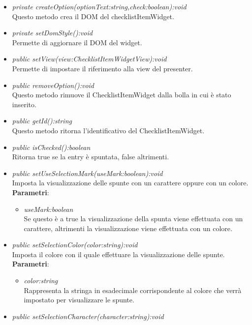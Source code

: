 \begin{itemize}
\begin{itemize}
\begin{itemize}
		\end{itemize}
	\item \textit{private createOption(optionText:string,check:boolean):void}\\
	Questo metodo crea il DOM del checklistItemWidget.
	\item \textit{private setDomStyle():void}\\
	Permette di aggiornare il DOM del widget.
	\item \textit{public setView(view:ChecklistItemWidgetView):void}\\
	Permette di impostare il riferimento alla view del presenter.
	\item \textit{public removeOption():void}\\
	Questo metodo rimuove il ChecklistItemWidget dalla bolla in cui è stato inserito.
	\item \textit{public getId():string}\\
	Questo metodo ritorna l'identificativo del ChecklistItemWidget.
	\item \textit{public isChecked():boolean}\\
	Ritorna true se la entry è spuntata, false altrimenti.
	\item \textit{public setUseSelectionMark(useMark:boolean):void}\\
	Imposta la visualizzazione delle spunte con un carattere oppure con un colore.
		\\ \textbf{Parametri}: \begin{itemize}
		\item \textit{useMark:boolean}\\
		Se questo è a true la visualizzazione della spunta viene effettuata con un carattere, altrimenti la visualizzazione viene effettuata con un colore.
		\end{itemize}  
	\item \textit{public setSelectionColor(color:string):void}\\
	Imposta il colore con il quale effettuare la visualizzazione delle spunte.
		\\ \textbf{Parametri}: \begin{itemize}
		\item \textit{color:string}\\
		Rappresenta la stringa in esadecimale corrispondente al colore che verrà impostato per visualizzare le spunte.
		\end{itemize}  
	\item \textit{public setSelectionCharacter(character:string):void}\\

\end{itemize}
\end{itemize}
